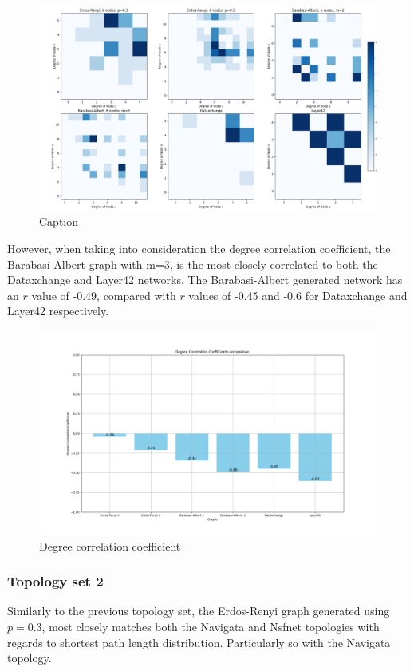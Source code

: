 \begin{figure}
    \centering
    \includegraphics[width=0.9\linewidth]{images/FINAL-TOPO-COMP/Degree-correlation-matrices/6-matrix.png}
    \caption{Caption}
    \label{fig:enter-label}
\end{figure}

However, when taking into consideration the degree correlation coefficient, the Barabasi-Albert graph with m=3, is the most closely correlated to both the Dataxchange and Layer42 networks. The Barabasi-Albert generated network has an $r$ value of -0.49, compared with $r$ values of -0.45 and -0.6 for Dataxchange and Layer42 respectively.  

\begin{figure}
    \centering
    \includegraphics[width=0.9\linewidth]{images/FINAL-TOPO-COMP/Degree-correlation-coeff/deg-coeff-6.png}
    \caption{Degree correlation coefficient}
    \label{fig:enter-label}
\end{figure}

\subsubsection{Topology set 2}
Similarly to the previous topology set, the Erdos-Renyi graph generated using $p=0.3$, most closely matches both the Navigata and Nsfnet topologies with regards to shortest path length distribution. Particularly so with the Navigata topology.

